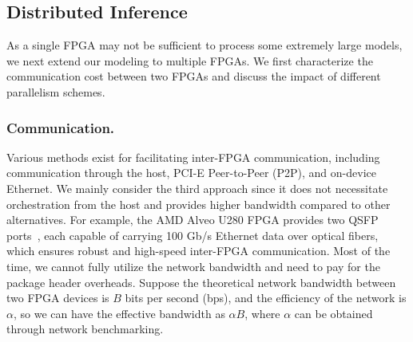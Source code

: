 \subsection{Distributed Inference}
\label{sub:multifpga}
As a single FPGA may not be sufficient to process some extremely large models, we next extend our modeling to multiple FPGAs.
We first characterize the communication cost between two FPGAs and discuss the impact of different parallelism schemes.

\subsubsection{Communication.}
Various methods exist for facilitating inter-FPGA communication, including communication through the host, PCI-E Peer-to-Peer (P2P), and on-device Ethernet.
We mainly consider the third approach since it does not necessitate orchestration from the host and provides higher bandwidth compared to other alternatives.
For example, the AMD Alveo U280 FPGA provides two QSFP ports~\cite{qsfp}, each capable of carrying 100 Gb/s Ethernet data over optical fibers, which ensures robust and high-speed inter-FPGA communication.
Most of the time, we cannot fully utilize the network bandwidth and need to pay for the package header overheads.
Suppose the theoretical network bandwidth between two FPGA devices is $B$ bits per second (bps), and the efficiency of the network is $\alpha$, so we can have the effective bandwidth as $\alpha B$, where $\alpha$ can be obtained through network benchmarking.


